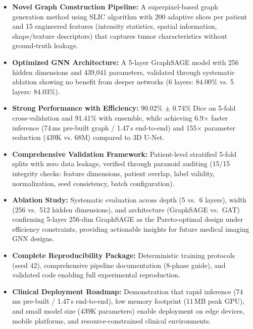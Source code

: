 \begin{itemize}

    \item \textbf{Novel Graph Construction Pipeline:} A superpixel-based graph generation method using SLIC algorithm with 200 adaptive slices per patient and 15 engineered features (intensity statistics, spatial information, shape/texture descriptors) that captures tumor characteristics without ground-truth leakage.
    
    \item \textbf{Optimized GNN Architecture:} A 5-layer GraphSAGE model with 256 hidden dimensions and 439,041 parameters, validated through systematic ablation showing no benefit from deeper networks (6 layers: 84.00\% vs. 5 layers: 84.03\%).
    
    \item \textbf{Strong Performance with Efficiency:} 90.02\% $\pm$ 0.74\% Dice on 5-fold cross-validation and 91.41\% with ensemble, while achieving 6.9$\times$ faster inference (74\,ms pre-built graph / 1.47\,s end-to-end) and 155$\times$ parameter reduction (439K vs. 68M) compared to 3D U-Net.
    
    \item \textbf{Comprehensive Validation Framework:} Patient-level stratified 5-fold splits with zero data leakage, verified through paranoid auditing (15/15 integrity checks: feature dimensions, patient overlap, label validity, normalization, seed consistency, batch configuration).
    
    \item \textbf{Ablation Study:} Systematic evaluation across depth (5 vs.\ 6 layers), width (256 vs.\ 512 hidden dimensions), and architecture (GraphSAGE vs.\ GAT) confirming 5-layer 256-dim GraphSAGE as the Pareto-optimal design under efficiency constraints, providing actionable insights for future medical imaging GNN designs.

    \item \textbf{Complete Reproducibility Package:} Deterministic training protocols (seed 42), comprehensive pipeline documentation (8-phase guide), and validated code enabling full experimental reproduction.
    
    \item \textbf{Clinical Deployment Roadmap:} Demonstration that rapid inference (74\,ms pre-built / 1.47\,s end-to-end), low memory footprint (11\,MB peak GPU), and small model size (439K parameters) enable deployment on edge devices, mobile platforms, and resource-constrained clinical environments.
\end{itemize}


